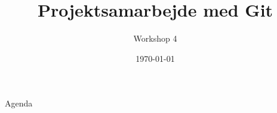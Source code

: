\documentclass[10pt]{beamer}
\title{Projektsamarbejde med Git}
\subtitle{Workshop 4}
\date{\today}
\begin{document}
{\aauwavesbg
  \begin{frame}
    \titlepage
  \end{frame}}

\begin{frame}{Agenda}
  \tableofcontents
\end{frame}
\end{document}
